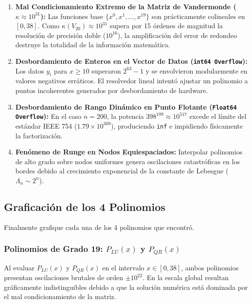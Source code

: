 \documentclass[11pt,a4paper]{article}
\theoremstyle{definition}
\theoremstyle{remark}
\begin{document}
\begin{enumerate}[leftmargin=*]
    \item \textbf{Mal Condicionamiento Extremo de la Matriz de Vandermonde ($\kappa \approx 10^{31}$):}
    Las funciones base $\{x^0, x^1, \dots, x^{19}\}$ son prácticamente colineales en $[0, 38]$. Como $\kappa(V_{20}) \approx 10^{31}$ supera por 15 órdenes de magnitud la resolución de precisión doble ($10^{16}$), la amplificación del error de redondeo destruye la totalidad de la información matemática.
    \item \textbf{Desbordamiento de Enteros en el Vector de Datos (\texttt{int64 Overflow}):}
    Los datos $y_i$ para $x \ge 10$ superaron $2^{63}-1$ y se envolvieron modularmente en valores negativos erráticos. El resolvedor lineal intentó ajustar un polinomio a puntos incoherentes generados por desbordamiento de hardware.
    \item \textbf{Desbordamiento de Rango Dinámico en Punto Flotante (\texttt{Float64 Overflow}):}
    En el caso $n = 200$, la potencia $398^{199} \approx 10^{517}$ excede el límite del estándar IEEE 754 ($1.79 \times 10^{308}$), produciendo \texttt{inf} e impidiendo físicamente la factorización.
    \item \textbf{Fenómeno de Runge en Nodos Equiespaciados:}
    Interpolar polinomios de alto grado sobre nodos uniformes genera oscilaciones catastróficas en los bordes debido al crecimiento exponencial de la constante de Lebesgue ($\Lambda_n \sim 2^n$).
\end{enumerate}

\subsection{Graficación de los 4 Polinomios}

\begin{solbox}[Gráficas]
Finalmente grafique cada una de los 4 polinomios que encontró.
\end{solbox}

\subsubsection{Polinomios de Grado 19: $P_{LU}(x)$ y $P_{QR}(x)$}
Al evaluar $P_{LU}(x)$ y $P_{QR}(x)$ en el intervalo $x \in [0, 38]$, ambos polinomios presentan oscilaciones brutales de orden $\pm 10^{22}$. En la escala global resultan gráficamente indistinguibles debido a que la solución numérica está dominada por el mal condicionamiento de la matriz.
\end{document}

